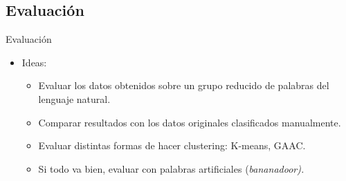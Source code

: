 \documentclass[xcolor=x11names,compress]{beamer}
\renewcommand{\(}{\begin{columns}}
\renewcommand{\)}{\end{columns}}
\newcommand{\<}[1]{\begin{column}{#1}}
\renewcommand{\>}{\end{column}}
\begin{document}
\subsection{Evaluación}
\begin{frame}{Evaluación}
\begin{itemize}
\item Ideas:
\begin{itemize}
\item Evaluar los datos obtenidos sobre un grupo reducido de palabras del lenguaje natural.
\item Comparar resultados con los datos originales clasificados manualmente.
\item Evaluar distintas formas de hacer clustering: K-means, GAAC.
\item Si todo va bien, evaluar con palabras artificiales (\em bananadoor\em).
\end{itemize}
\end{itemize}
\end{frame}
\end{document}
